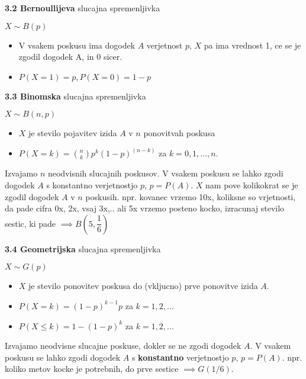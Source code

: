 \documentclass{article}
\begin{document}
\begin{multicols}{2}
	\textbf{3.2 Bernoullijeva} slucajna spremenljivka
	\begin{center}
		\begin{math}
			X \sim B(p)
		\end{math}
	\end{center}
	\begin{itemize}
		\item V vsakem poskusu ima dogodek $A$ verjetnost $p$, $X$ pa ima vrednost 1, ce se je zgodil dogodek A, in 0 sicer.
		\item $P(X = 1) = p, P(X = 0) = 1 - p$
	\end{itemize}


	\textbf{3.3 Binomska} slucajna spremenljivka
	\begin{center}
		\begin{math}
			X \sim B(n, p)
		\end{math}
	\end{center}
	\begin{itemize}
		\item $X$ je stevilo pojavitev izida $A$ v $n$ ponovitvah poskusa
		\item $P(X = k) = {n \choose k} p^{k} (1 - p)^{(n - k)}$ za $k = 0,1, \dots, n.$
	\end{itemize}
	Izvajamo $n$ neodvisnih slucajnih poskusov. V vsakem poskusu se lahko zgodi dogodek $A$ s
	konstantno verjetnostjo $p$, $p =  P(A)$.
	$X$ nam pove kolikokrat se je zgodil dogodek $A$ v $n$ poskusih.
	npr. kovanec vrzemo 10x, koliksne so vrjetnosti, da pade cifra 0x, 2x, vsaj 3x,..
	ali 5x vrzemo posteno kocko, izracunaj stevilo sestic, ki pade $\implies B(5, \dfrac{1}{6})$

	\textbf{3.4 Geometrijska} slucajna spremenljivka
	\begin{center}
		\begin{math}
			X \sim G(p)
		\end{math}
	\end{center}
	\begin{itemize}
		\item $X$ je stevilo ponovitev poskusa do (vkljucno) prve ponovitve izida $A$.
		\item $P(X = k) = (1 - p)^{k - 1} p$ za $k = 1,2, \dots$
		\item $P(X \leq k) = 1 - (1 - p)^{k}$ za $k = 1,2, \dots$
	\end{itemize}
	Izvajamo  neodvisne slucajne poskuse, dokler se ne zgodi dogodek $A$. V vsakem poskusu
	se lahko zgodi dogodek $A$  s \textbf{konstantno} verjetnostjo $p$, $p =  P(A)$.
	npr. koliko metov kocke je potrebnih, do prve sestice $\implies G(1/6)$.


\end{multicols}
\end{document}
